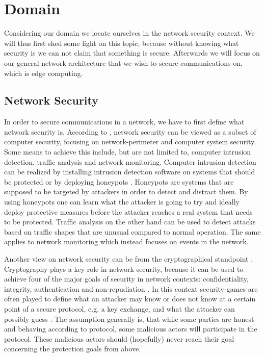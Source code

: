 \section{Domain}
Considering our domain we locate ourselves in the network security context. We will thus first shed some light on this topic, because without knowing what security is we can not claim that something is secure. Afterwards we will focus on our general network architecture that we wish to secure communications on, which is edge computing.

\subsection{Network Security}
In order to secure communications in a network, we have to first define what network security is. According to \cite{netsec}, network security can be viewed as a subset of computer security, focusing on network-perimeter and computer system security. Some means to achieve this include, but are not limited to, computer intrusion detection, traffic analysis and network monitoring. Computer intrusion detection can be realized by installing intrusion detection software on systems that should be protected or by deploying honeypots \cite{honeypot}. Honeypots are systems that are supposed to be targeted by attackers in order to detect and distract them. By using honeypots one can learn what the attacker is going to try and ideally deploy protective measures before the attacker reaches a real system that needs to be protected. Traffic analysis on the other hand can be used to detect attacks based on traffic shapes that are unusual compared to normal operation. The same applies to network monitoring which instead focuses on events in the network.

Another view on network security can be from the cryptographical standpoint \cite{netsec}. Cryptography plays a key role in network security, because it can be used to achieve four of the major goals of security in network contexts: confidentiality, integrity, authentication and non-repudiation \cite{cryptography}. In this context security-games are often played to define what an attacker may know or does not know at a certain point of a secure protocol, e.g. a key exchange, and what the attacker can possibly guess \cite{games}. The assumption generally is, that while some parties are honest and behaving according to protocol, some malicious actors will participate in the protocol. These malicious actors should (hopefully) never reach their goal concerning the protection goals from above.

